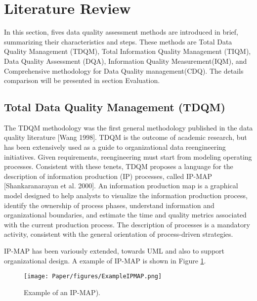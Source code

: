 \documentclass[pdftex,english,oribibl]{llncs}
\begin{document}
\section{Literature Review}
In this section, fives data quality assessment methods are introduced in brief, summarizing their characteristics and steps. These methods are Total Data Quality Management (TDQM), Total Information Quality Management (TIQM), Data Quality Assessment (DQA), Information Quality Measurement(IQM), and Comprehensive methodology for Data Quality management(CDQ). The details comparison will be presented in section Evaluation.

\subsection{Total Data Quality Management (TDQM)}\label{sec:TDQM}

The TDQM methodology was the first general methodology published in the data quality literature [Wang 1998]. TDQM is the outcome of academic research, but has been extensively used as a guide to organizational data reengineering initiatives.
Given requirements, reengineering must start from modeling operating processes. Consistent with these tenets, TDQM proposes a language for the description of information production (IP) processes, called IP-MAP [Shankaranarayan et al. 2000]. An information production map is a graphical model designed to help analysts to visualize the information production process, identify the ownership of process phases, understand information and organizational boundaries, and estimate the time and quality metrics associated with the current production process.
The description of processes is a mandatory activity, consistent with the general orientation of process-driven strategies.
\begin{comment}
IP-MAP is the only language for information process modeling and represents a de facto standard. Practical experiences with TDQM are reported, for example, in Kovac and Weickert [2002].
\end{comment}
IP-MAP has been variously extended, towards UML and also to support organizational design.  A example of IP-MAP is shown in Figure \ref{fig:ExampleIPMAP}.

\begin{figure}
    \centering
    \texttt{[image: Paper/figures/ExampleIPMAP.png]}
    \caption{Example of an IP-MAP).}
    \label{fig:ExampleIPMAP}
 \end{figure}
\end{document}
